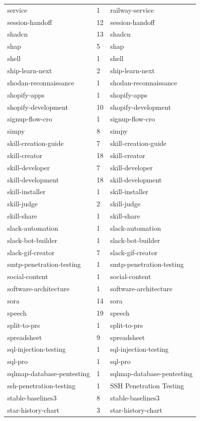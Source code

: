 \begin{longtable}{@{}lll@{}}
service & 1 & railway-service\\
session-handoff & 12 & session-handoff\\
shadcn & 13 & shadcn\\
shap & 5 & shap\\
shell & 1 & shell\\
ship-learn-next & 2 & ship-learn-next\\
shodan-reconnaissance & 1 & shodan-reconnaissance\\
shopify-apps & 1 & shopify-apps\\
shopify-development & 10 & shopify-development\\
signup-flow-cro & 1 & signup-flow-cro\\
simpy & 8 & simpy\\
skill-creation-guide & 7 & skill-creation-guide\\
skill-creator & 18 & skill-creator\\
skill-developer & 7 & skill-developer\\
skill-development & 18 & skill-development\\
skill-installer & 1 & skill-installer\\
skill-judge & 2 & skill-judge\\
skill-share & 1 & skill-share\\
slack-automation & 1 & slack-automation\\
slack-bot-builder & 1 & slack-bot-builder\\
slack-gif-creator & 7 & slack-gif-creator\\
smtp-penetration-testing & 1 & smtp-penetration-testing\\
social-content & 1 & social-content\\
software-architecture & 1 & software-architecture\\
sora & 14 & sora\\
speech & 19 & speech\\
split-to-prs & 1 & split-to-prs\\
spreadsheet & 9 & spreadsheet\\
sql-injection-testing & 1 & sql-injection-testing\\
sql-pro & 1 & sql-pro\\
sqlmap-database-pentesting & 1 & sqlmap-database-pentesting\\
ssh-penetration-testing & 1 & SSH Penetration Testing\\
stable-baselines3 & 8 & stable-baselines3\\
star-history-chart & 3 & star-history-chart\\

\end{longtable}
